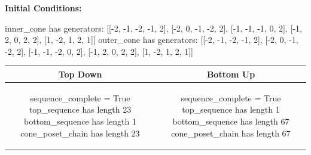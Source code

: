 \documentclass[10pt]{article}
\begin{document}
\textbf{Initial Conditions:}
\begin{SAGE}
inner_cone has generators: 
[[-2, -1, -2, -1, 2], [-2, 0, -1, -2, 2], [-1, -1, -1, 0, 2], [-1, 2, 0, 2, 2], [1, -2, 1, 2, 1]]
outer_cone has generators: 
[[-2, -1, -2, -1, 2], [-2, 0, -1, -2, 2], [-1, -1, -2, 0, 2], [-1, 2, 0, 2, 2], [1, -2, 1, 2, 1]]

\end{SAGE}
\begin{tabular}{c|c}
\textbf{Top Down} & \textbf{Bottom Up} \\ \hline  
\begin{SAGE}
sequence_complete = True
top_sequence has length 23
bottom_sequence has length 1
cone_poset_chain has length 23
\end{SAGE} 
&
\begin{SAGE}
sequence_complete = True
top_sequence has length 1
bottom_sequence has length 67
cone_poset_chain has length 67
\end{SAGE} 
\\ \hline


\end{tabular}
\end{document}
